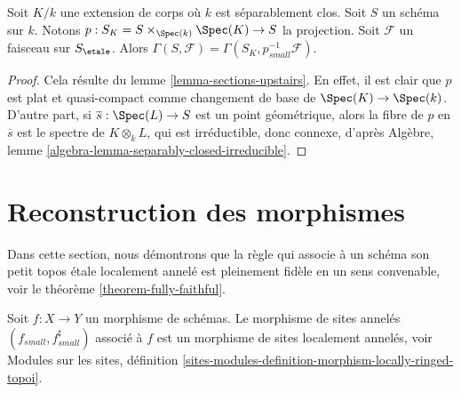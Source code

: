 \begin{lemma}
\label{lemma-sections-base-field-extension}
Soit $K/k$ une extension de corps o\`u $k$ est
s\'eparablement clos. Soit $S$ un sch\'ema sur $k$. Notons
$p : S_K = S \times_{\Spec(k)} \Spec(K) \to S$ la projection.
Soit $\mathcal{F}$ un faisceau sur $S_\etale$.
Alors $\Gamma(S, \mathcal{F}) = \Gamma(S_K, p^{-1}_{small}\mathcal{F})$.
\end{lemma}

\begin{proof}
Cela r\'esulte du lemme \ref{lemma-sections-upstairs}. En effet, il est clair
que $p$ est plat et quasi-compact comme changement de base de
$\Spec(K) \to \Spec(k)$. D'autre part, si $\overline{s} : \Spec(L) \to S$
est un point g\'eom\'etrique, alors la fibre de $p$ en $\overline{s}$
est le spectre de $K \otimes_k L$, qui est irr\'eductible, donc connexe, d'apr\`es
Algèbre, lemme \ref{algebra-lemma-separably-closed-irreducible}.
\end{proof}









\section{Reconstruction des morphismes}
\label{section-morphisms}

\noindent
Dans cette section, nous d\'emontrons que la r\`egle qui associe \`a un sch\'ema
son petit topos \'etale localement annel\'e est pleinement fid\`ele en un sens
convenable, voir le
th\'eor\`eme \ref{theorem-fully-faithful}.

\begin{lemma}
\label{lemma-morphism-locally-ringed}
Soit $f : X \to Y$ un morphisme de sch\'emas.
Le morphisme de sites annel\'es $(f_{small}, f_{small}^\sharp)$
associ\'e \`a $f$ est un morphisme de sites localement annel\'es, voir
Modules sur les sites,
définition \ref{sites-modules-definition-morphism-locally-ringed-topoi}.
\end{lemma}

